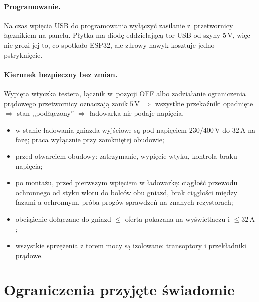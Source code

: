 \documentclass[a4paper,11pt]{article}
\newcommand{\volt}{\,\mathrm{V}}
\newcommand{\amp}{\,\mathrm{A}}
\begin{document}
\paragraph{Programowanie.} Na czas wpięcia USB do programowania wyłączyć zasilanie
z~przetwornicy łącznikiem na panelu. Płytka ma diodę oddzielającą tor USB od
szyny $5\volt$, więc nie grozi jej to, co spotkało ESP32, ale zdrowy nawyk kosztuje
jedno pstryknięcie.

\paragraph{Kierunek bezpieczny bez zmian.} Wypięta wtyczka testera, łącznik
w~pozycji OFF albo zadziałanie ograniczenia prądowego przetwornicy oznaczają
zanik $5\volt$ $\Rightarrow$ wszystkie przekaźniki opadnięte $\Rightarrow$ stan
,,podłączony'' $\Rightarrow$ ładowarka nie podaje napięcia.

\begin{itemize}
\item w stanie ładowania gniazda wyjściowe są pod napięciem $230/400\volt$ do
      $32\amp$ na fazę; praca wyłącznie przy zamkniętej obudowie;
\item przed otwarciem obudowy: zatrzymanie, wypięcie wtyku, kontrola braku napięcia;
\item po montażu, przed pierwszym wpięciem w ładowarkę: ciągłość przewodu ochronnego
      od styku wlotu do bolców obu gniazd, brak ciągłości między fazami a ochronnym,
      próba progów sprawdzeń na znanych rezystorach;
\item obciążenie dołączane do gniazd $\le$ oferta pokazana na wyświetlaczu
      i $\le 32\amp$;
\item wszystkie sprzężenia z torem mocy są izolowane: transoptory i przekładniki
      prądowe.
\end{itemize}

\section{Ograniczenia przyjęte świadomie}
\end{document}
